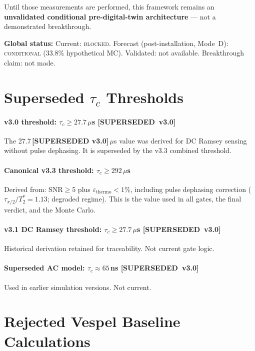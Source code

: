 \documentclass[12pt,a4paper]{article}
\newcommand{\blocked}{\textsc{blocked}}
\newcommand{\conditional}{\textsc{conditional}}
\newcommand{\superseded}{\textbf{[SUPERSEDED~v3.0]}}
\begin{document}
Until those measurements are performed, this framework remains an \textbf{unvalidated
conditional pre-digital-twin architecture} --- not a demonstrated breakthrough.

\textbf{Global status:}
Current: \blocked{}.
Forecast (post-installation, Mode~D): \conditional{} (33.8\% hypothetical MC).
Validated: not available.
Breakthrough claim: not made.

\appendix

\section{Superseded $\tau_c$ Thresholds}
\label{app:tau_superseded}

\paragraph{v3.0 threshold: $\tau_c \geq 27.7\,\mu$s \superseded{}}
The 27.7\,\textbf{[SUPERSEDED v3.0]}\,$\mu$s value was derived for DC Ramsey sensing without pulse dephasing.
It is superseded by the v3.3 combined threshold.

\paragraph{Canonical v3.3 threshold: $\tau_c \geq 292\,\mu$s}
Derived from: SNR$\geq5$ plus $\varepsilon_\mathrm{thermo}<1\%$,
including pulse dephasing correction ($\tau_{\pi/2}/T_2^* = 1.13$; degraded regime).
This is the value used in all gates, the final verdict, and the Monte Carlo.

\paragraph{v3.1 DC Ramsey threshold: $\tau_c \geq 27.7\,\mu$s \superseded{}}
Historical derivation retained for traceability.
Not current gate logic.

\paragraph{Superseded AC model: $\tau_c \approx 65$\,ns \superseded{}}
Used in earlier simulation versions.
Not current.

\section{Rejected Vespel Baseline Calculations}
\label{app:vespel_rejected}
\end{document}
